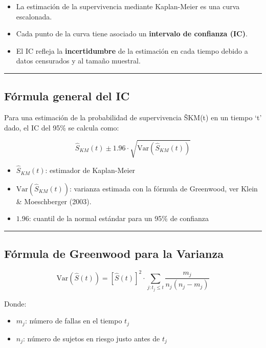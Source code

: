 \documentclass[
]{article}
\providecommand{\tightlist}{%
  \setlength{\itemsep}{0pt}\setlength{\parskip}{0pt}}
\begin{document}
\begin{itemize}
\tightlist
\item
  La estimación de la supervivencia mediante Kaplan-Meier es una curva
  escalonada.
\item
  Cada punto de la curva tiene asociado un \textbf{intervalo de
  confianza (IC)}.
\item
  El IC refleja la \textbf{incertidumbre} de la estimación en cada
  tiempo debido a datos censurados y al tamaño muestral.
\end{itemize}

\begin{center}\rule{0.5\linewidth}{0.5pt}\end{center}

\subsection{Fórmula general del IC}\label{fuxf3rmula-general-del-ic}

Para una estimación de la probabilidad de supervivencia ŜKM(t) en un
tiempo `t' dado, el IC del 95\% se calcula como:

\[
\hat{S}_{KM}(t) \pm 1.96 \cdot \sqrt{\text{Var}(\hat{S}_{KM}(t))}
\]

\begin{itemize}
\tightlist
\item
  \(\hat{S}_{KM}(t)\): estimador de Kaplan-Meier
\item
  \(\text{Var}(\hat{S}_{KM}(t))\): varianza estimada con la fórmula de
  Greenwood, ver Klein \& Moeschberger (2003).
\item
  \(1.96\): cuantil de la normal estándar para un 95\% de confianza
\end{itemize}

\begin{center}\rule{0.5\linewidth}{0.5pt}\end{center}

\subsection{Fórmula de Greenwood para la
Varianza}\label{fuxf3rmula-de-greenwood-para-la-varianza}

\[
\text{Var}(\hat{S}(t)) = [\hat{S}(t)]^2 \cdot \sum_{j: t_j \leq t} \frac{m_j}{n_j(n_j - m_j)}
\]

Donde:

\begin{itemize}
\tightlist
\item
  \(m_j\): número de fallas en el tiempo \(t_j\)
\item
  \(n_j\): número de sujetos en riesgo justo antes de \(t_j\)
\end{itemize}
\end{document}
